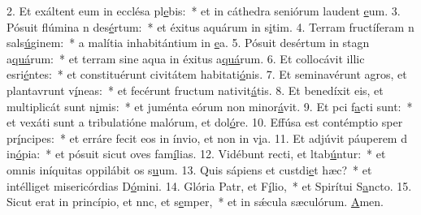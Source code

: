2. Et exáltent eum in ecclésa pl\uline{e}bis:~* et in cáthedra seniórum laudent \uline{e}um.
3. Pósuit flúmina n des\uline{é}rtum:~* et éxitus aquárum in s\uline{i}tim.
4. Terram fructíferam n sals\uline{ú}ginem:~* a malítia inhabitántium in \uline{e}a.
5. Pósuit desértum in stagn a\uline{quá}rum:~* et terram sine aqua in éxitus a\uline{quá}rum.
6. Et collocávit illic esri\uline{é}ntes:~* et constituérunt civitátem habitati\uline{ó}nis.
7. Et seminavérunt agros, et plantavrunt v\uline{í}neas:~* et fecérunt fructum nativit\uline{á}tis.
8. Et benedíxit eis, et multiplicát sunt n\uline{i}mis:~* et juménta eórum non minor\uline{á}vit.
9. Et pci f\uline{a}cti sunt:~* et vexáti sunt a tribulatióne malórum, et dol\uline{ó}re.
10. Effúsa est contémptio sper pr\uline{í}ncipes:~* et erráre fecit eos in ínvio, et non in v\uline{i}a.
11. Et adjúvit páuperem d in\uline{ó}pia:~* et pósuit sicut oves fam\uline{í}lias.
12. Vidébunt recti, et ltab\uline{ú}ntur:~* et omnis iníquitas oppilábit os s\uline{u}um.
13. Quis sápiens et custdi\uline{e}t hæc?~* et intélliget misericórdias D\uline{ó}mini.
14. Glória Patr, et F\uline{í}lio,~* et Spirítui S\uline{a}ncto.
15. Sicut erat in princípio, et nnc, et s\uline{e}mper,~* et in sǽcula sæculórum. \uline{A}men.
